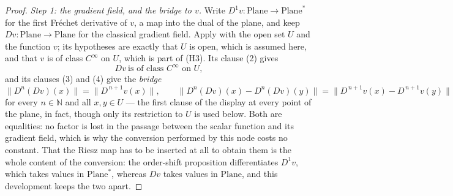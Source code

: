 \begin{proof}
\noindent\emph{Step 1: the gradient field, and the bridge to $v$.}
Write $D^{1}v\colon\mathrm{Plane}\to\mathrm{Plane}^{*}$ for the first Fr\'echet derivative of
$v$, a map into the dual of the plane, and keep $Dv\colon\mathrm{Plane}\to\mathrm{Plane}$ for
the classical gradient field.  Apply  with the open set $U$
and the function $v$; its hypotheses are exactly that $U$ is open, which is assumed here, and
that $v$ is of class $C^{\infty}$ on $U$, which is part of (H3).  Its clause (2) gives
\begin{equation}\label{eq:cfss-greg}
  Dv\ \text{is of class }C^{\infty}\text{ on }U,
\end{equation}
and its clauses (3) and (4) give the \emph{bridge}
\begin{equation}\label{eq:cfss-bridge}
  \bigl\lVert D^{n}(Dv)(x)\bigr\rVert=\bigl\lVert D^{\,n+1}v(x)\bigr\rVert,
  \qquad
  \bigl\lVert D^{n}(Dv)(x)-D^{n}(Dv)(y)\bigr\rVert
    =\bigl\lVert D^{\,n+1}v(x)-D^{\,n+1}v(y)\bigr\rVert
\end{equation}
for every $n\in\mathbb{N}$ and all $x,y\in U$ --- the first clause of the display at every
point of the plane, in fact, though only its restriction to $U$ is used below.  Both are
equalities: no factor is lost in the passage between the scalar function and its gradient
field, which is why the conversion performed by this node costs no constant.  That the Riesz
map has to be inserted at all to obtain them is the whole content of the conversion: the
order-shift proposition differentiates $D^{1}v$, which takes values in $\mathrm{Plane}^{*}$,
whereas $Dv$ takes values in $\mathrm{Plane}$, and this development keeps the two apart.


\end{proof}
